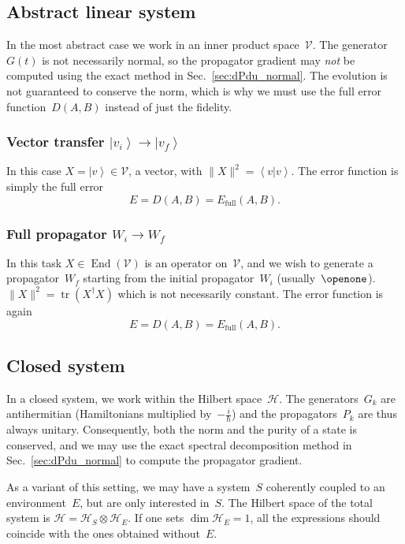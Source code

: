 \documentclass[aps, pra, a4paper, longbibliography, superscriptaddress]{revtex4-1}
\newcommand{\I}{\openone}
\newcommand{\be}{\begin{equation}}
\newcommand{\ee}{\end{equation}}
\newcommand{\ket}[1]{\left| #1 \right \rangle}
\newcommand{\braket}[2]{\left \langle #1 | #2 \right \rangle}
\newcommand{\hilb}[1]{\mathcal{#1}}
\DeclareMathOperator{\End}{End} %
\DeclareMathOperator{\tr}{tr}
\begin{document}
\subsection{Abstract linear system}

In the most abstract case we work in an inner product space~$\hilb{V}$.
The generator~$G(t)$ is not necessarily normal, so
the propagator gradient may \emph{not} be computed using the exact
method in Sec.~\ref{sec:dPdu_normal}.
The evolution is not guaranteed to conserve the norm, which is why we must
use the full error function~$D(A,B)$ instead of just the fidelity.


\subsubsection{Vector transfer $\ket{v_i} \to \ket{v_f}$}

In this case $X = \ket{v} \in \hilb{V}$, a vector, with
$\|X\|^2 = \braket{v}{v}$.
The error function is simply the full error
\be
E = D(A, B) = E_\text{full}(A, B).
\ee

\subsubsection{Full propagator $W_i \to W_f$}

In this task
$X \in \End(\hilb{V})$
is an operator on~$\hilb{V}$, and
we wish to generate a propagator~$W_f$
starting from the initial propagator~$W_i$ (usually~$\I$).
$\|X\|^2 = \tr(X^\dagger X)$ which is not necessarily constant.
The error function is again
\be
E = D(A, B) = E_\text{full}(A, B).
\ee


\subsection{Closed system}

In a closed system, we work within the Hilbert space~$\hilb{H}$.
The generators~$G_k$ are antihermitian (Hamiltonians multiplied by~$-\frac{i}{\hbar}$)
and the propagators~$P_k$ are thus always
unitary. Consequently, both the norm and the purity of a state is conserved,
and we may use the exact spectral decomposition method in
Sec.~\ref{sec:dPdu_normal} to compute the propagator gradient.

As a variant of this setting,
we may have a system~$S$ coherently coupled to an
environment~$E$, but are only interested in~$S$.
The Hilbert space of the total system is
$\hilb{H} = \hilb{H}_S \otimes \hilb{H}_E$.
If one sets $\dim \hilb{H}_E = 1$, all the expressions should coincide with the ones obtained without~$E$.
\end{document}
